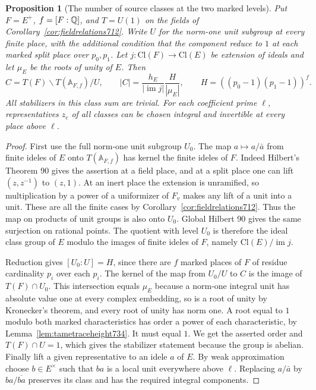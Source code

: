\documentclass[a4paper,11pt]{article}
\newtheorem{proposition}{Proposition}[section]
\theoremstyle{definition}
\theoremstyle{remark}
\numberwithin{equation}{section}
\begin{document}
\begin{proposition}[The number of source classes at the two marked levels]
\leavevmode\label{prop:torusorder736}
Put \(F=E^+\), \(f=[F:\mathbb Q]\), and \(T=U(1)\) on the fields of
Corollary~\ref{cor:fieldrelations712}. Write \(U\) for the norm-one
unit subgroup at every finite place, with the additional condition
that the component reduce to \(1\) at each marked split place over
\(p_0,p_1\). Let \(j:\mathrm{Cl}(F)\to\mathrm{Cl}(E)\) be extension
of ideals and let \(\mu_E\) be the roots of unity of \(E\). Then
\[
 C=T(F)\backslash T(\mathbb A_{F,f})/U,\qquad
 |C|=
 \frac{h_E}{|\operatorname{im}j|}
 \frac{H}{|\mu_E|},\qquad H=((p_0-1)(p_1-1))^f .
\]
All stabilizers in this class sum are trivial. For each coefficient
prime \(\ell\), representatives \(z_c\) of all classes can be chosen
integral and invertible at every place above \(\ell\).
\end{proposition}
\begin{proof}
First use the full norm-one unit subgroup \(U_0\). The map
\(a\mapsto a/\bar a\) from finite ideles of \(E\) onto
\(T(\mathbb A_{F,f})\) has kernel the finite ideles of \(F\).
Indeed Hilbert's Theorem 90 gives the assertion at a field place,
and at a split place one can lift \((z,z^{-1})\) to \((z,1)\).
At an inert place the extension is unramified, so multiplication
by a power of a uniformizer of \(F_v\) makes any lift of a unit
into a unit. These are all the
finite cases by Corollary~\ref{cor:fieldrelations712}. Thus the
map on products of unit groups is also onto \(U_0\). Global Hilbert
90 gives the same surjection on rational points. The quotient with
level \(U_0\) is therefore the ideal class group of \(E\) modulo
the images of finite ideles of \(F\), namely
\(\mathrm{Cl}(E)/\operatorname{im}j\).

Reduction gives \([U_0:U]=H\), since there are \(f\) marked
places of \(F\) of residue cardinality \(p_i\) over each \(p_i\).
The kernel of the map from \(U_0/U\) to \(C\) is the image of
\(T(F)\cap U_0\). This intersection equals \(\mu_E\) because a norm-one
integral unit has absolute value one at every complex embedding,
so is a root of unity by Kronecker's theorem, and every root of
unity has norm one. A root equal to \(1\) modulo both marked
characteristics has order a power of each characteristic, by
Lemma~\ref{lem:tametraceheight734}. It must equal \(1\).
We get the asserted order and \(T(F)\cap U=1\), which gives the
stabilizer statement because the group is abelian.
Finally lift a given representative to an idele \(a\) of \(E\).
By weak approximation choose \(b\in E^\times\) such that \(ba\)
is a local unit everywhere above \(\ell\). Replacing \(a/\bar a\)
by \(ba/\overline{ba}\) preserves its class and has the required
integral components.
\end{proof}
\end{document}
